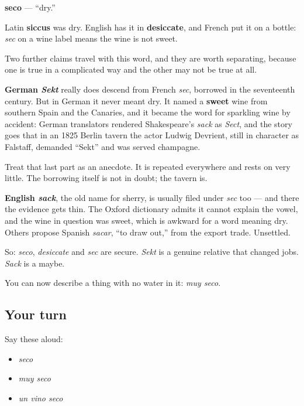 \begin{cousinweb}
\textbf{seco} — \textquotedblleft{}dry.\textquotedblright{}

Latin \textbf{siccus} was dry. English has it in \textbf{desiccate}, and French put it on a bottle: \emph{sec} on a wine label means the wine is not sweet.

Two further claims travel with this word, and they are worth separating, because one is true in a complicated way and the other may not be true at all.

\textbf{German \emph{Sekt}} really does descend from French \emph{sec}, borrowed in the seventeenth century. But in German it never meant dry. It named a \textbf{sweet} wine from southern Spain and the Canaries, and it became the word for sparkling wine by accident: German translators rendered Shakespeare's \emph{sack} as \emph{Sect}, and the story goes that in an 1825 Berlin tavern the actor Ludwig Devrient, still in character as Falstaff, demanded \textquotedblleft{}Sekt\textquotedblright{} and was served champagne.

Treat that last part as an anecdote. It is repeated everywhere and rests on very little. The borrowing itself is not in doubt; the tavern is.

\textbf{English \emph{sack}}, the old name for sherry, is usually filed under \emph{sec} too — and there the evidence gets thin. The Oxford dictionary admits it cannot explain the vowel, and the wine in question was sweet, which is awkward for a word meaning dry. Others propose Spanish \emph{sacar}, \textquotedblleft{}to draw out,\textquotedblright{} from the export trade. Unsettled.

So: \emph{seco}, \emph{desiccate} and \emph{sec} are secure. \emph{Sekt} is a genuine relative that changed jobs. \emph{Sack} is a maybe.
\end{cousinweb}

\begin{grammarlens}[title={What you've built}]
You can now describe a thing with no water in it: \emph{muy seco}.
\end{grammarlens}

\subsection*{Your turn}
Say these aloud:

\begin{itemize}
\raggedright
  \item \emph{seco}
  \item \emph{muy seco}
  \item \emph{un vino seco}
\end{itemize}

